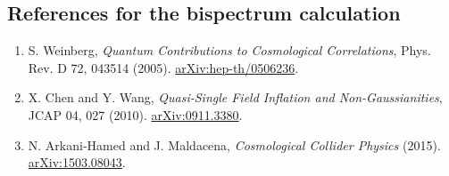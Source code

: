 \documentclass[11pt,a4paper]{article}
\begin{document}
\subsection*{References for the bispectrum calculation}
\begin{enumerate}\small\setlength{\itemsep}{1pt}
\item S. Weinberg, \emph{Quantum Contributions to Cosmological Correlations}, Phys. Rev. D 72, 043514 (2005). \href{https://arxiv.org/abs/hep-th/0506236}{arXiv:hep-th/0506236}.
\item X. Chen and Y. Wang, \emph{Quasi-Single Field Inflation and Non-Gaussianities}, JCAP 04, 027 (2010). \href{https://arxiv.org/abs/0911.3380}{arXiv:0911.3380}.
\item N. Arkani-Hamed and J. Maldacena, \emph{Cosmological Collider Physics} (2015). \href{https://arxiv.org/abs/1503.08043}{arXiv:1503.08043}.
\end{enumerate}


\clearpage
\end{document}
